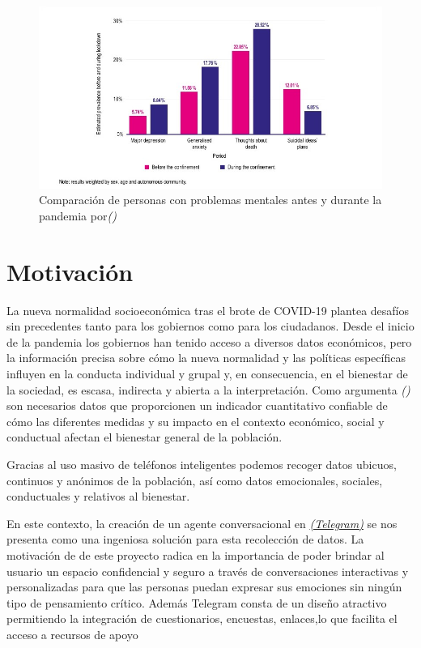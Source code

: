 \begin{figure}[!ht]
    \centering
    \includegraphics[width=1\textwidth]{imagenes/graficaCovid.jpg}
    \caption{ Comparación de personas con problemas mentales antes y durante la pandemia por\textit{(\cite{impactocovid})}}
    \label{fig:enter-label}
\end{figure}


\section{Motivación}

La nueva normalidad socioeconómica tras el brote de COVID-19 plantea desafíos sin precedentes tanto para los gobiernos como para los ciudadanos. Desde el inicio de la pandemia los gobiernos han tenido acceso a diversos datos económicos, pero la información precisa sobre cómo la nueva normalidad y las políticas específicas influyen en la conducta individual y grupal y, en consecuencia, en el bienestar de la sociedad, es escasa, indirecta y abierta a la interpretación. Como argumenta \textit{(\cite{medicion2009})} son necesarios datos que proporcionen un indicador cuantitativo confiable de cómo las diferentes medidas y su impacto en el contexto económico, social y conductual afectan el bienestar general de la población.\vspace{0.3cm}

Gracias al uso masivo de teléfonos inteligentes podemos recoger datos ubicuos, continuos y anónimos de la población, así como datos emocionales, sociales, conductuales y relativos al bienestar.\vspace{0.3cm}

En este contexto, la creación de un agente conversacional en \href{https://telegram.com.es/}{\textit{(Telegram)}} se nos presenta como una ingeniosa solución para esta recolección de datos. La motivación de de este proyecto radica en la importancia de poder brindar al usuario un espacio confidencial y seguro a través de conversaciones interactivas y personalizadas para que las personas puedan expresar sus emociones sin ningún tipo de pensamiento crítico.
Además Telegram consta de un diseño atractivo permitiendo la integración de cuestionarios, encuestas, enlaces,lo que facilita el acceso a recursos de apoyo\vspace{0.3cm}

